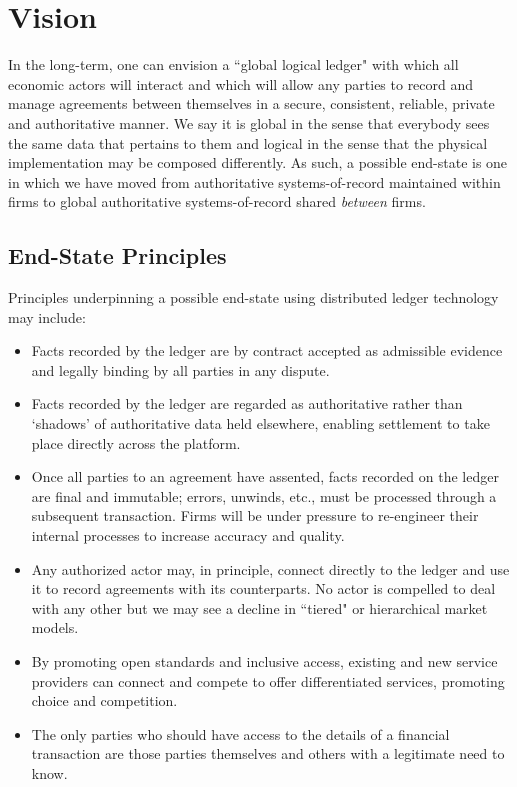 \documentclass{article}
\begin{document}
\section{Vision}
In the long-term, one can envision a ``global logical ledger" with which all economic actors will interact and which will allow any parties to record and manage agreements between themselves in a secure, consistent, reliable, private and authoritative manner. We say it is global in the sense that everybody sees the same data that pertains to them and logical in the sense that the physical implementation may be composed differently. As such, a possible end-state is one in which we have moved from authoritative systems-of-record maintained within firms to global authoritative systems-of-record shared \textit{between} firms. 

\subsection{End-State Principles}
Principles underpinning a possible end-state using distributed ledger technology may include:
\begin{itemize}
	\item Facts recorded by the ledger are by contract accepted as admissible evidence and legally binding by all parties in any dispute.
	\item Facts recorded by the ledger are regarded as authoritative rather than `shadows' of authoritative data held elsewhere, enabling settlement to take place directly across the platform.
	\item Once all parties to an agreement have assented, facts recorded on the ledger are final and immutable; errors, unwinds, etc., must be processed through a subsequent transaction. Firms will be under pressure to re-engineer their internal processes to increase accuracy and quality.
	\item Any authorized actor may, in principle, connect directly to the ledger and use it to record agreements with its counterparts. No actor is compelled to deal with any other but we may see a decline in ``tiered" or hierarchical market models. 
	\item By promoting open standards and inclusive access, existing and new service providers can connect and compete to offer differentiated services, promoting choice and competition.
	\item The only parties who should have access to the details of a financial transaction are those parties themselves and others with a legitimate need to know.
\end{itemize}
\end{document}
